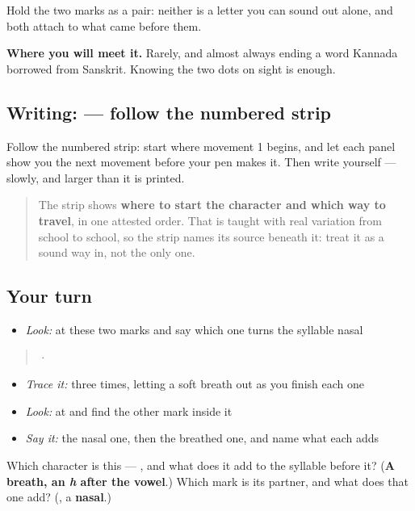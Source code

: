 Hold the two marks as a pair: neither is a letter you can sound out alone, and both attach to what came before them.

\textbf{Where you will meet it.} Rarely, and almost always ending a word Kannada borrowed from Sanskrit. Knowing the two dots on sight is enough.

\subsection*{Writing:  — follow the numbered strip}

Follow the numbered strip: start where movement 1 begins, and let each panel show you the next movement before your pen makes it. Then write  yourself — slowly, and larger than it is printed.

\begin{quote}
The strip shows \textbf{where to start the character and which way to travel}, in one attested order. That is taught with real variation from school to school, so the strip names its source beneath it: treat it as a sound way in, not the only one.
\end{quote}

\subsection*{Your turn}
\begin{itemize}
\raggedright
  \item \emph{Look:} at these two marks and say which one turns the syllable nasal
\end{itemize}

\begin{quote}
  ·  
\end{quote}

\begin{itemize}
\raggedright
  \item \emph{Trace it:}  three times, letting a soft breath out as you finish each one
  \item \emph{Look:} at  and find the other mark inside it
  \item \emph{Say it:} the nasal one, then the breathed one, and name what each adds
\end{itemize}

\begin{tcolorbox}[breakable,colback=teal!4,colframe=teal!35!black,title={Before you move on}]
Which character is this — , and what does it add to the syllable before it? (\textbf{A breath, an \emph{h} after the vowel}.) Which mark is its partner, and what does that one add? (\textbf{}, a \textbf{nasal}.)
\end{tcolorbox}
